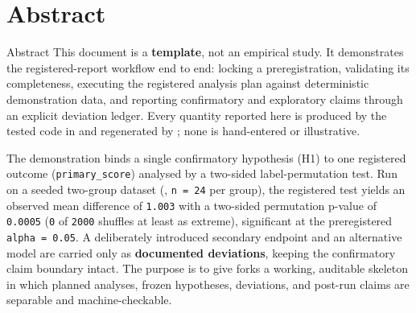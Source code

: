 \documentclass[
  ignorenonframetext,
]{beamer}
\author{\texorpdfstring{}{}}
\date{}
\begin{document}
\section{Abstract}\label{sec:abstract}

\begin{frame}{Abstract}
This document is a \textbf{template}, not an empirical study. It
demonstrates the registered-report workflow end to end: locking a
preregistration, validating its completeness, executing the registered
analysis plan against deterministic demonstration data, and reporting
confirmatory and exploratory claims through an explicit deviation
ledger. Every quantity reported here is produced by the tested code in
 and regenerated by
; none is hand-entered or
illustrative.

The demonstration binds a single confirmatory hypothesis (H1) to one
registered outcome (\texttt{primary\_score}) analysed by a two-sided
label-permutation test. Run on a seeded two-group dataset
(, \texttt{n\ =\ 24} per group), the
registered test yields an observed mean difference of \texttt{1.003}
with a two-sided permutation p-value of \texttt{0.0005} (\texttt{0} of
\texttt{2000} shuffles at least as extreme), significant at the
preregistered \texttt{alpha\ =\ 0.05}. A deliberately introduced
secondary endpoint and an alternative model are carried only as
\textbf{documented deviations}, keeping the confirmatory claim boundary
intact. The purpose is to give forks a working, auditable skeleton in
which planned analyses, frozen hypotheses, deviations, and post-run
claims are separable and machine-checkable.
\end{frame}
\end{document}
